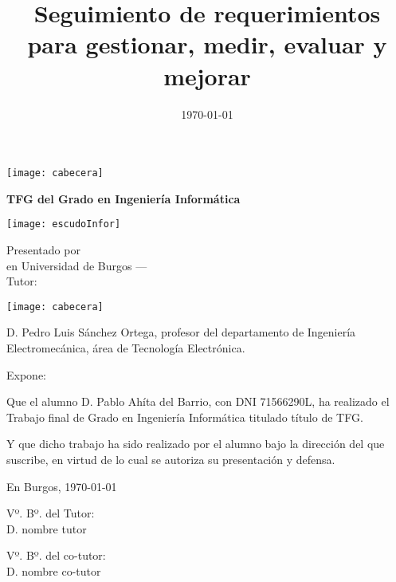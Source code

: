 \documentclass[a4paper,12pt,twoside]{memoir}
\title{ Seguimiento de requerimientos para gestionar, medir, evaluar y mejorar}
\author{\nombre}
\date{\today}
\makeatletter
\def\maketitle{
  \null
  \thispagestyle{empty}
\noindent\texttt{[image: cabecera]}\vspace{1cm}%
  \vfill
  \colorbox{cpardoBox}{%
    \begin{minipage}{.8\textwidth}
      \vspace{.5cm}\Large
      \begin{center}
      \textbf{TFG del Grado en Ingeniería Informática}\vspace{.6cm}\\
      \textbf{\LARGE\@title{}}
      \end{center}
      \vspace{.2cm}
    \end{minipage}

  }%
  \hfill\begin{minipage}{.20\textwidth}
    \texttt{[image: escudoInfor]}
  \end{minipage}
  \vfill
  \begin{center}%
  {%
    \noindent\LARGE
    Presentado por \@author{}\\ 
    en Universidad de Burgos --- \@date{}\\
    Tutor: \@tutor{}\\
  }%
  \end{center}%
  \null
  \cleardoublepage
  }
\newcommand{\nombre}{Pablo Ahíta del Barrio} %
\newcommand{\dni}{71566290L}
\makeatother
\begin{document}
\maketitle


\newpage\null\thispagestyle{empty}\newpage


\thispagestyle{empty}


\noindent\texttt{[image: cabecera]}\vspace{1cm}

\noindent D. Pedro Luis Sánchez Ortega, profesor del departamento de Ingeniería Electromecánica, área de Tecnología Electrónica.

\noindent Expone:

\noindent Que el alumno D. \nombre, con DNI \dni, ha realizado el Trabajo final de Grado en Ingeniería Informática titulado título de TFG. 

\noindent Y que dicho trabajo ha sido realizado por el alumno bajo la dirección del que suscribe, en virtud de lo cual se autoriza su presentación y defensa.

\begin{center} %
En Burgos, {\large \today}
\end{center}

\vfill\vfill\vfill

\begin{minipage}{0.45\textwidth}
\begin{flushleft} %
Vº. Bº. del Tutor:\\[2cm]
D. nombre tutor
\end{flushleft}
\end{minipage}
\hfill
\begin{minipage}{0.45\textwidth}
\begin{flushleft} %
Vº. Bº. del co-tutor:\\[2cm]
D. nombre co-tutor
\end{flushleft}
\end{minipage}
\hfill

\vfill



\newpage\null\thispagestyle{empty}\newpage




\frontmatter
\end{document}
